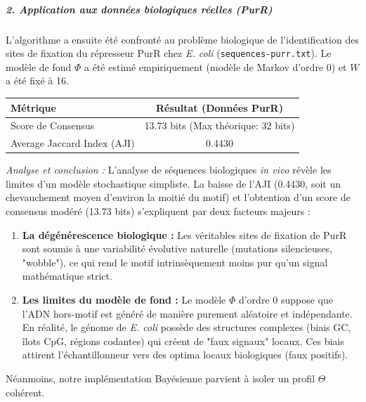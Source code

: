 \subparagraph{2. Application aux données biologiques réelles (PurR)}
L'algorithme a ensuite été confronté au problème biologique de l'identification des sites de fixation du répresseur PurR chez \textit{E. coli} (\texttt{sequences-purr.txt}). Le modèle de fond $\Phi$ a été estimé empiriquement (modèle de Markov d'ordre 0) et $W$ a été fixé à 16.

\begin{center}
\renewcommand{\arraystretch}{1.2}
\begin{tabular}{|l|c|}
    \hline
    \textbf{Métrique} & \textbf{Résultat (Données PurR)} \\
    \hline
    Score de Consensus & 13.73 bits (Max théorique: 32 bits) \\
    Average Jaccard Index (AJI) & 0.4430 \\
    \hline
\end{tabular}
\end{center}

\textit{Analyse et conclusion :} L'analyse de séquences biologiques \textit{in vivo} révèle les limites d'un modèle stochastique simpliste. La baisse de l'AJI (0.4430, soit un chevauchement moyen d'environ la moitié du motif) et l'obtention d'un score de consensus modéré (13.73 bits) s'expliquent par deux facteurs majeurs :
\begin{enumerate}
    \item \textbf{La dégénérescence biologique :} Les véritables sites de fixation de PurR sont soumis à une variabilité évolutive naturelle (mutations silencieuses, "wobble"), ce qui rend le motif intrinsèquement moins pur qu'un signal mathématique strict.
    \item \textbf{Les limites du modèle de fond :} Le modèle $\Phi$ d'ordre 0 suppose que l'ADN hors-motif est généré de manière purement aléatoire et indépendante. En réalité, le génome de \textit{E. coli} possède des structures complexes (biais GC, îlots CpG, régions codantes) qui créent de "faux signaux" locaux. Ces biais attirent l'échantillonneur vers des optima locaux biologiques (faux positifs).
\end{enumerate}
Néanmoins, notre implémentation Bayésienne parvient à isoler un profil $\Theta$ cohérent.